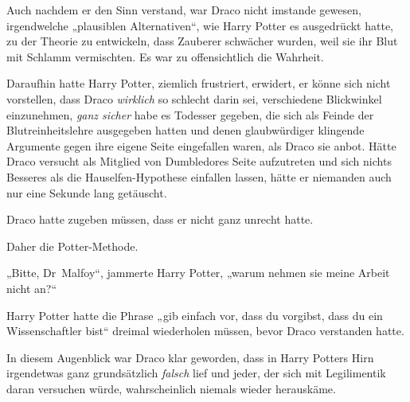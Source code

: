 Auch nachdem er den Sinn verstand, war Draco nicht imstande gewesen, irgendwelche „plausiblen Alternativen“, wie Harry Potter es ausgedrückt hatte, zu der Theorie zu entwickeln, dass Zauberer schwächer wurden, weil sie ihr Blut mit Schlamm vermischten. Es war zu offensichtlich die Wahrheit.

Daraufhin hatte Harry Potter, ziemlich frustriert, erwidert, er könne sich nicht vorstellen, dass Draco \emph{wirklich} so schlecht darin sei, verschiedene Blickwinkel einzunehmen, \emph{ganz sicher} habe es Todesser gegeben, die sich als Feinde der Blutreinheitslehre ausgegeben hatten und denen glaubwürdiger klingende Argumente gegen ihre eigene Seite eingefallen waren, als Draco sie anbot. Hätte Draco versucht als Mitglied von Dumbledores Seite aufzutreten und sich nichts Besseres als die Hauselfen-Hypothese einfallen lassen, hätte er niemanden auch nur eine Sekunde lang getäuscht.

Draco hatte zugeben müssen, dass er nicht ganz unrecht hatte.

Daher die Potter-Methode.

„Bitte, Dr~Malfoy“, jammerte Harry Potter, „warum nehmen sie meine Arbeit nicht an?“

Harry Potter hatte die Phrase „gib einfach vor, dass du vorgibst, dass du ein Wissenschaftler bist“ dreimal wiederholen müssen, bevor Draco verstanden hatte.

In diesem Augenblick war Draco klar geworden, dass in Harry Potters Hirn irgendetwas ganz grundsätzlich \emph{falsch} lief und jeder, der sich mit Legilimentik daran versuchen würde, wahrscheinlich niemals wieder herauskäme.

